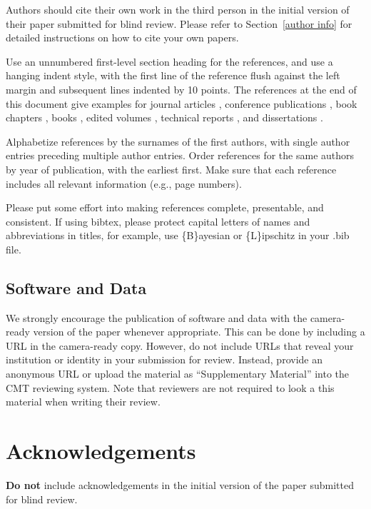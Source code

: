 \documentclass{article}
\begin{document}
Authors should cite their own work in the third person
in the initial version of their paper submitted for blind review.
Please refer to Section~\ref{author info} for detailed instructions on how to
cite your own papers.

Use an unnumbered first-level section heading for the references, and use a
hanging indent style, with the first line of the reference flush against the
left margin and subsequent lines indented by 10 points. The references at the
end of this document give examples for journal articles \cite{Samuel59},
conference publications \cite{langley00}, book chapters \cite{Newell81}, books
\cite{DudaHart2nd}, edited volumes \cite{MachineLearningI}, technical reports
\cite{mitchell80}, and dissertations \cite{kearns89}.

Alphabetize references by the surnames of the first authors, with
single author entries preceding multiple author entries. Order
references for the same authors by year of publication, with the
earliest first. Make sure that each reference includes all relevant
information (e.g., page numbers).

Please put some effort into making references complete, presentable, and
consistent. If using bibtex, please protect capital letters of names and
abbreviations in titles, for example, use \{B\}ayesian or \{L\}ipschitz
in your .bib file.

\subsection{Software and Data}

We strongly encourage the publication of software and data with the
camera-ready version of the paper whenever appropriate. This can be
done by including a URL in the camera-ready copy. However, do not
include URLs that reveal your institution or identity in your
submission for review. Instead, provide an anonymous URL or upload
the material as ``Supplementary Material'' into the CMT reviewing
system. Note that reviewers are not required to look a this material
when writing their review.

\section*{Acknowledgements}

\textbf{Do not} include acknowledgements in the initial version of
the paper submitted for blind review.
\end{document}
